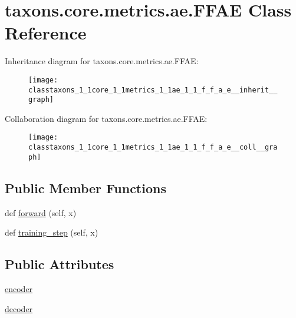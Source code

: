 \hypertarget{classtaxons_1_1core_1_1metrics_1_1ae_1_1_f_f_a_e}{}\section{taxons.\+core.\+metrics.\+ae.\+F\+F\+AE Class Reference}
\label{classtaxons_1_1core_1_1metrics_1_1ae_1_1_f_f_a_e}


Inheritance diagram for taxons.\+core.\+metrics.\+ae.\+F\+F\+AE\+:
\nopagebreak
\begin{figure}[H]
\begin{center}
\leavevmode
\texttt{[image: classtaxons\_1\_1core\_1\_1metrics\_1\_1ae\_1\_1\_f\_f\_a\_e\_\_inherit\_\_graph]}
\end{center}
\end{figure}


Collaboration diagram for taxons.\+core.\+metrics.\+ae.\+F\+F\+AE\+:
\nopagebreak
\begin{figure}[H]
\begin{center}
\leavevmode
\texttt{[image: classtaxons\_1\_1core\_1\_1metrics\_1\_1ae\_1\_1\_f\_f\_a\_e\_\_coll\_\_graph]}
\end{center}
\end{figure}
\subsection*{Public Member Functions}
\begin{DoxyCompactItemize}
\item 
def \hyperlink{classtaxons_1_1core_1_1metrics_1_1ae_1_1_f_f_a_e_a062c17d2f6195d462d3981b57e007724}{forward} (self, x)
\item 
def \hyperlink{classtaxons_1_1core_1_1metrics_1_1ae_1_1_f_f_a_e_a16441b370db28f55628beb64248a463e}{training\+\_\+step} (self, x)
\end{DoxyCompactItemize}
\subsection*{Public Attributes}
\begin{DoxyCompactItemize}
\item 
\hyperlink{classtaxons_1_1core_1_1metrics_1_1ae_1_1_f_f_a_e_a6a659ea23dceb6a01e2222fe8545e5fc}{encoder}
\item 
\hyperlink{classtaxons_1_1core_1_1metrics_1_1ae_1_1_f_f_a_e_aadcd88c7f653846a70830e6adbd98458}{decoder}
\end{DoxyCompactItemize}


